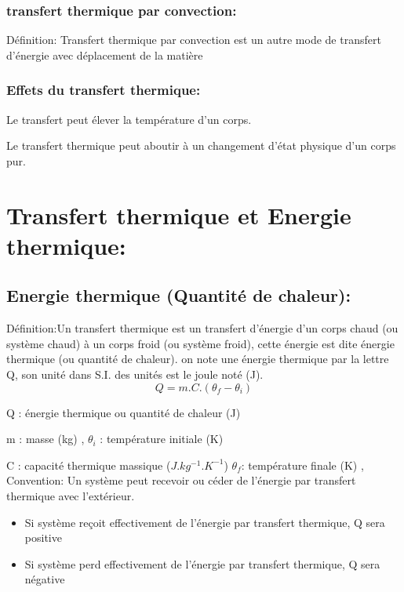 \documentclass[12pt]{article}
\begin{document}
\subsubsection{transfert thermique par convection: }
{Définition:} Transfert thermique par convection est un autre mode de transfert d’énergie avec
déplacement de la matière

\subsubsection{Effets du transfert thermique:}

Le transfert peut élever la température d'un corps.

Le transfert thermique peut aboutir à un
changement d'état physique d'un corps pur.

\section{ Transfert thermique et Energie thermique:}
\subsection{Energie thermique (Quantité de chaleur): }

 {Définition:}Un transfert thermique est un transfert d'énergie d'un corps chaud (ou système chaud)
à un corps froid (ou système froid), cette énergie est dite énergie thermique (ou quantité de
chaleur). on note une énergie thermique par la lettre Q, son unité dans S.I. des unités est le
joule noté (J).
$$Q = m.C.(\theta_f - \theta_i)$$

Q : énergie thermique ou quantité de chaleur (J) 

m : masse (kg) , $\theta_i$ : température initiale (K)

C : capacité thermique massique ($J.kg^{-1}.K^{-1}$)
$\theta_f$: température finale (K) , 
\\Convention: Un système peut recevoir ou céder de l’énergie
par transfert thermique avec l'extérieur.
\begin{itemize}
        \item Si système reçoit effectivement de
l’énergie par transfert thermique, Q sera positive 
\item Si système perd effectivement de l’énergie
par transfert thermique, Q sera négative
\end{itemize}
\end{document}
